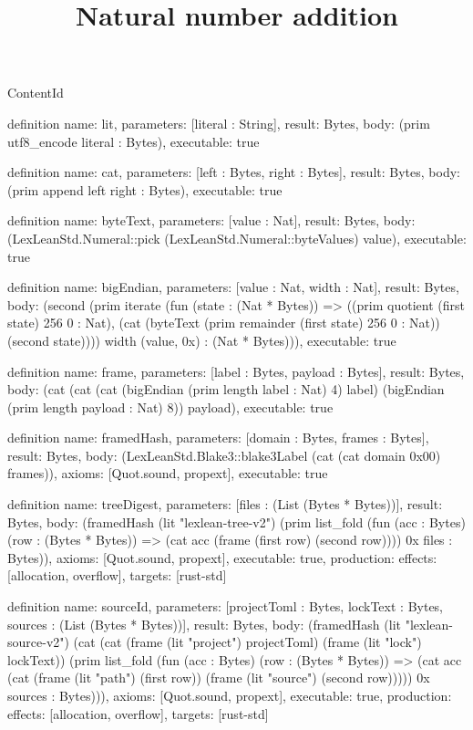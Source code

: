\begin{lexlean}{ContentId}
\title{Natural number addition}
\begin{semanticmodule}
definition{
  name: lit,
  parameters: [literal : String],
  result: Bytes,
  body: (prim utf8_encode literal : Bytes),
  executable: true
}

definition{
  name: cat,
  parameters: [left : Bytes, right : Bytes],
  result: Bytes,
  body: (prim append left right : Bytes),
  executable: true
}

definition{
  name: byteText,
  parameters: [value : Nat],
  result: Bytes,
  body: (LexLeanStd.Numeral::pick (LexLeanStd.Numeral::byteValues) value),
  executable: true
}

definition{
  name: bigEndian,
  parameters: [value : Nat, width : Nat],
  result: Bytes,
  body: (second (prim iterate (fun (state : (Nat * Bytes)) => ((prim quotient (first state) 256 0 : Nat), (cat (byteText (prim remainder (first state) 256 0 : Nat)) (second state)))) width (value, 0x) : (Nat * Bytes))),
  executable: true
}

definition{
  name: frame,
  parameters: [label : Bytes, payload : Bytes],
  result: Bytes,
  body: (cat (cat (cat (bigEndian (prim length label : Nat) 4) label) (bigEndian (prim length payload : Nat) 8)) payload),
  executable: true
}

definition{
  name: framedHash,
  parameters: [domain : Bytes, frames : Bytes],
  result: Bytes,
  body: (LexLeanStd.Blake3::blake3Label (cat (cat domain 0x00) frames)),
  axioms: [Quot.sound, propext],
  executable: true
}

definition{
  name: treeDigest,
  parameters: [files : (List (Bytes * Bytes))],
  result: Bytes,
  body: (framedHash (lit "lexlean-tree-v2") (prim list_fold (fun (acc : Bytes) (row : (Bytes * Bytes)) => (cat acc (frame (first row) (second row)))) 0x files : Bytes)),
  axioms: [Quot.sound, propext],
  executable: true,
  production: {effects: [allocation, overflow], targets: [rust-std]}
}

definition{
  name: sourceId,
  parameters: [projectToml : Bytes, lockText : Bytes, sources : (List (Bytes * Bytes))],
  result: Bytes,
  body: (framedHash (lit "lexlean-source-v2") (cat (cat (frame (lit "project") projectToml) (frame (lit "lock") lockText)) (prim list_fold (fun (acc : Bytes) (row : (Bytes * Bytes)) => (cat acc (cat (frame (lit "path") (first row)) (frame (lit "source") (second row))))) 0x sources : Bytes))),
  axioms: [Quot.sound, propext],
  executable: true,
  production: {effects: [allocation, overflow], targets: [rust-std]}
}


\end{semanticmodule}
\end{lexlean}
